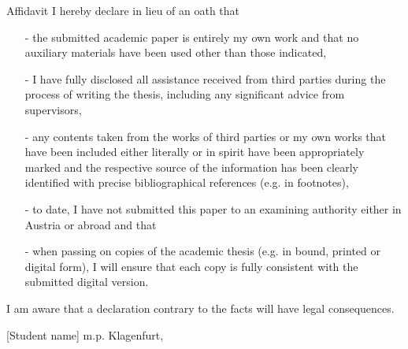 \begin{preface}{Affidavit}
I hereby declare in lieu of an oath that
\begin{itemize}
    \item[-] the submitted academic paper is entirely my own work and that no auxiliary materials have been used other than those indicated,
    \item[-] 	I have fully disclosed all assistance received from third parties during the process of writing the thesis, including any significant advice from supervisors,
    \item[-] 	any contents taken from the works of third parties or my own works that have been included either literally or in spirit have been appropriately marked and the respective source of the information has been clearly identified with precise bibliographical references (e.g. in footnotes),
    \item[-] 	to date, I have not submitted this paper to an examining authority either in Austria or abroad and that
    \item[-] 	when passing on copies of the academic thesis (e.g. in bound, printed or digital form), I will ensure that each copy is fully consistent with the submitted digital version.
\end{itemize}
I am aware that a declaration contrary to the facts will have legal consequences.

\vspace{10mm}

[Student name] m.p.
\hfill
Klagenfurt, \ffinaldate


\end{preface}
